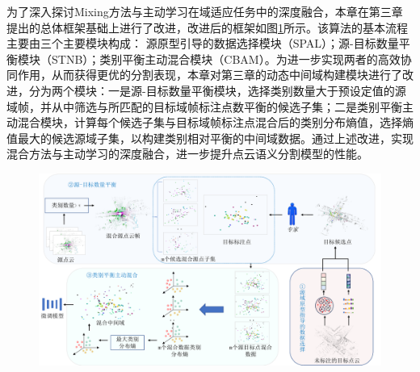     为了深入探讨Mixing方法与主动学习在域适应任务中的深度融合，本章在第三章提出的总体框架基础上进行了改进，改进后的框架如图\ref{fig:4-1}所示。该算法的基本流程主要由三个主要模块构成：%
    源原型引导的数据选择模块（SPAL）；源-目标数量平衡模块（STNB）；类别平衡主动混合模块（CBAM）。为进一步实现两者的高效协同作用，从而获得更优的分割表现，本章对第三章的动态中间域构建模块进行了改进，分为两个模块：一是源-目标数量平衡模块，选择类别数量大于预设定值的源域帧，并从中筛选与所匹配的目标域帧标注点数平衡的候选子集；二是类别平衡主动混合模块，计算每个候选子集与目标域帧标注点混合后的类别分布熵值，选择熵值最大的候选源域子集，以构建类别相对平衡的中间域数据。通过上述改进，实现混合方法与主动学习的深度融合，进一步提升点云语义分割模型的性能。 
    \begin{figure}[H]
        \vspace{-0.1cm}
        \centering
        \includegraphics[width = \textwidth, scale=0.5]{ljx/figure/4-1framwork.pdf}
        \label{fig:4-1}
        \vspace{-0.3cm}
    \end{figure}
    
